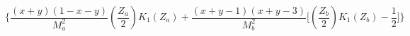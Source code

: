 \begin{equation}
\biggl\{\frac{(x+y)(1-x-y)}{M_{a}^{2}}
\left(\frac{Z_{a}}{2}\right)K_{1}(Z_{a})
+\frac{(x+y-1)(x+y-3)}{M_{b}^{2}}\biggl[
\left(\frac{Z_{b}}{2}\right)K_{1}(Z_{b})
-\frac{1}{2}\biggr]\biggr\}
\end{equation}

